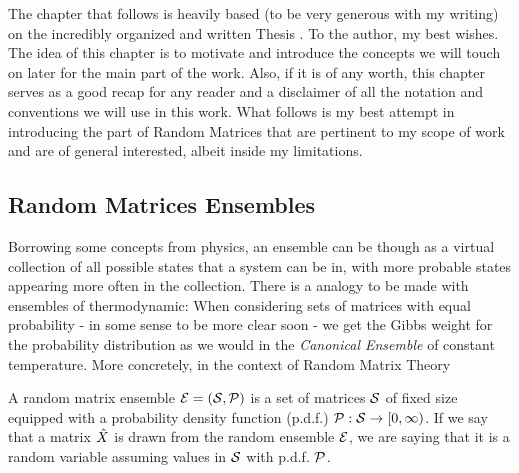 The chapter that follows is heavily based (to be very generous with my writing) on the incredibly organized and written Thesis \cite{rahman2023recursivecharacterisationsrandommatrix}. To the author, my best wishes. The idea of this chapter is to motivate and introduce the concepts we will touch on later for the main part of the work. Also, if it is of any worth, this chapter serves as a good recap for any reader and a disclaimer of all the notation and conventions we will use in this work. What follows is my best attempt in introducing the part of Random Matrices that are pertinent to my scope of work and are of general interested, albeit inside my limitations. 

\subsection{Random Matrices Ensembles}

Borrowing some concepts from physics, an ensemble can be though as a virtual collection of all possible states that a system can be in, with more probable states appearing more often in the collection. There is a analogy to be made with ensembles of thermodynamic: When considering sets of matrices with equal probability - in some sense to be more clear soon - we get the Gibbs weight for the probability distribution as we would in the \textit{Canonical Ensemble} of constant temperature. More concretely, in the context of Random Matrix Theory

\begin{definition}
	A random matrix ensemble $\mathcal{E} = (\mathcal{S}, \mathcal{P})$ is a set of matrices $\mathcal{S}$ of fixed size equipped with a probability density function (p.d.f.) $\mathcal{P}: \mathcal{S} \rightarrow [0, \infty)$. If we say that a matrix $\hat X$ is drawn from the random ensemble $\mathcal{E}$, we are saying that it is a random variable assuming values in $\mathcal{S}$ with p.d.f. $\mathcal{P}$.
	\label{Def: Ensemble}
\end{definition}

